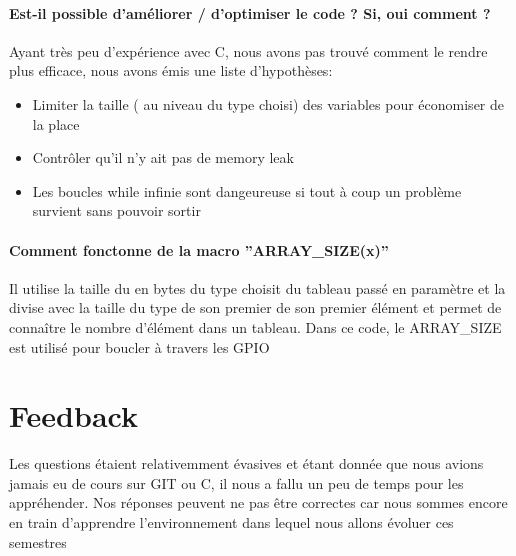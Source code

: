 \documentclass[a4paper]{article}
\begin{document}
\paragraph{ Est-il possible d’améliorer / d’optimiser le code ? Si, oui comment ?}
Ayant très peu d'expérience avec C, nous avons pas trouvé comment le rendre plus efficace, nous avons émis une liste d'hypothèses:
      \begin{itemize}
         \item Limiter la taille ( au niveau du type choisi) des variables pour économiser de la place
         \item Contrôler qu'il n'y ait pas de memory leak
         \item Les boucles while infinie sont dangeureuse si tout à coup un problème survient sans pouvoir sortir
      \end{itemize}

\paragraph{Comment fonctonne de la macro ”ARRAY\_SIZE(x)”}
Il utilise la taille du en bytes du type choisit du tableau passé en paramètre et la divise avec la taille du type de son premier de son premier élément et permet de connaître le nombre d'élément dans un tableau. Dans ce code, le ARRAY\_SIZE est utilisé pour boucler à travers les GPIO


\section{Feedback}
Les questions étaient relativemment évasives et étant donnée que nous avions jamais eu de cours sur GIT ou C, il nous a fallu un peu de temps pour les appréhender. Nos réponses peuvent ne pas être correctes car nous sommes encore en train d'apprendre l'environnement dans lequel nous allons évoluer ces semestres
\end{document}
